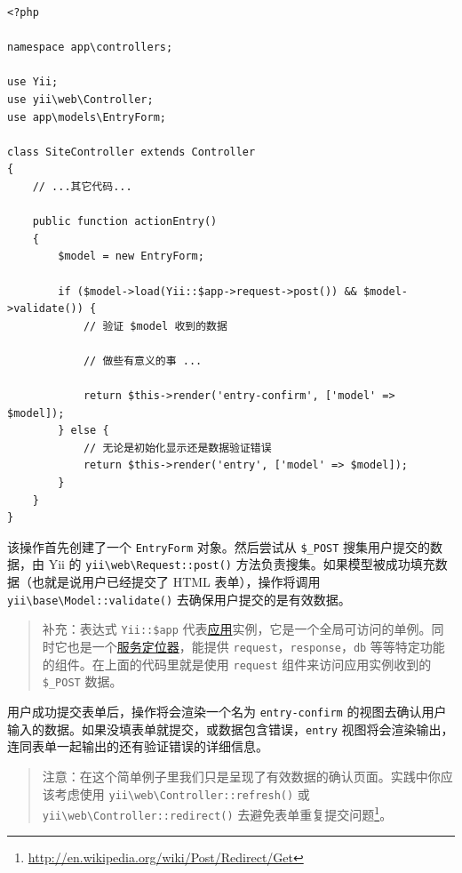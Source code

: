 \lstset{language=php}\begin{lstlisting}
<?php

namespace app\controllers;

use Yii;
use yii\web\Controller;
use app\models\EntryForm;

class SiteController extends Controller
{
    // ...其它代码...

    public function actionEntry()
    {
        $model = new EntryForm;

        if ($model->load(Yii::$app->request->post()) && $model->validate()) {
            // 验证 $model 收到的数据

            // 做些有意义的事 ...

            return $this->render('entry-confirm', ['model' => $model]);
        } else {
            // 无论是初始化显示还是数据验证错误
            return $this->render('entry', ['model' => $model]);
        }
    }
}
\end{lstlisting}
该操作首先创建了一个 \lstinline|EntryForm| 对象。然后尝试从 \lstinline|$_POST| 搜集用户提交的数据，由 Yii 的 \texttt{yii{\allowbreak{}\textbackslash}web{\allowbreak{}\textbackslash}Request\allowbreak{}::\allowbreak{}post()} 方法负责搜集。如果模型被成功填充数据（也就是说用户已经提交了 HTML 表单），操作将调用 \texttt{yii{\allowbreak{}\textbackslash}base{\allowbreak{}\textbackslash}Model\allowbreak{}::\allowbreak{}validate()} 去确保用户提交的是有效数据。

\begin{quote}补充：表达式 \lstinline|Yii::$app| 代表\hyperref[structure-applications.md]{应用}实例，它是一个全局可访问的单例。同时它也是一个\hyperref[concept-service-locator.md]{服务定位器}，能提供 \lstinline|request|，\lstinline|response|，\lstinline|db| 等等特定功能的组件。在上面的代码里就是使用 \lstinline|request| 组件来访问应用实例收到的 \lstinline|$_POST| 数据。

\end{quote}
用户成功提交表单后，操作将会渲染一个名为 \lstinline|entry-confirm| 的视图去确认用户输入的数据。如果没填表单就提交，或数据包含错误，\lstinline|entry| 视图将会渲染输出，连同表单一起输出的还有验证错误的详细信息。

\begin{quote}注意：在这个简单例子里我们只是呈现了有效数据的确认页面。实践中你应该考虑使用 \texttt{yii{\allowbreak{}\textbackslash}web{\allowbreak{}\textbackslash}Controller\allowbreak{}::\allowbreak{}refresh()} 或 \texttt{yii{\allowbreak{}\textbackslash}web{\allowbreak{}\textbackslash}Controller\allowbreak{}::\allowbreak{}redirect()} 去避免表单重复提交问题\footnote{\url{http://en.wikipedia.org/wiki/Post/Redirect/Get}}。

\end{quote}
